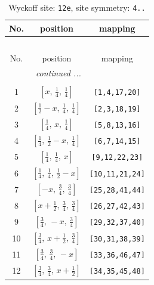 \documentclass[fleqn,8pt]{jsarticle}
\begin{document}
\begin{longtable}{ccc}
\caption{Wyckoff site: {\tt 12e}, site symmetry: {\tt 4..}}
 \\
 \hline \hline
No. & position & mapping \\ \hline \endfirsthead

\multicolumn{2}{l}{\tablename\ \thetable{}} \\
 \hline \hline
No. & position & mapping \\ \hline \endhead

 \hline \hline
\multicolumn{2}{r}{\footnotesize\it continued ...} \\ \endfoot

 \hline \hline
\multicolumn{2}{r}{} \\ \endlastfoot

1 & $\left[ x,\, \frac{1}{4},\, \frac{1}{4} \right]$ & {\tt [1,4,17,20]} \\ \hline
2 & $\left[ \frac{1}{2} - x,\, \frac{1}{4},\, \frac{1}{4} \right]$ & {\tt [2,3,18,19]} \\ \hline
3 & $\left[ \frac{1}{4},\, x,\, \frac{1}{4} \right]$ & {\tt [5,8,13,16]} \\ \hline
4 & $\left[ \frac{1}{4},\, \frac{1}{2} - x,\, \frac{1}{4} \right]$ & {\tt [6,7,14,15]} \\ \hline
5 & $\left[ \frac{1}{4},\, \frac{1}{4},\, x \right]$ & {\tt [9,12,22,23]} \\ \hline
6 & $\left[ \frac{1}{4},\, \frac{1}{4},\, \frac{1}{2} - x \right]$ & {\tt [10,11,21,24]} \\ \hline
7 & $\left[ - x,\, \frac{3}{4},\, \frac{3}{4} \right]$ & {\tt [25,28,41,44]} \\ \hline
8 & $\left[ x + \frac{1}{2},\, \frac{3}{4},\, \frac{3}{4} \right]$ & {\tt [26,27,42,43]} \\ \hline
9 & $\left[ \frac{3}{4},\, - x,\, \frac{3}{4} \right]$ & {\tt [29,32,37,40]} \\ \hline
10 & $\left[ \frac{3}{4},\, x + \frac{1}{2},\, \frac{3}{4} \right]$ & {\tt [30,31,38,39]} \\ \hline
11 & $\left[ \frac{3}{4},\, \frac{3}{4},\, - x \right]$ & {\tt [33,36,46,47]} \\ \hline
12 & $\left[ \frac{3}{4},\, \frac{3}{4},\, x + \frac{1}{2} \right]$ & {\tt [34,35,45,48]} \\
\end{longtable}
\renewcommand{\arraystretch}{1.2}
\end{document}
